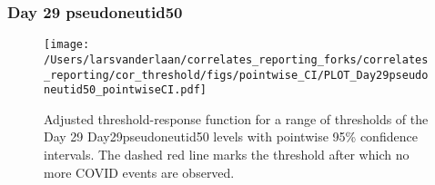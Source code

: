 \documentclass[]{article}
\begin{document}
\clearpage
\clearpage

\clearpage

\hypertarget{day-29-pseudoneutid50}{%
\subsubsection{Day 29 pseudoneutid50}\label{day-29-pseudoneutid50}}

\begin{figure}[H]
\centering
\texttt{[image: /Users/larsvanderlaan/correlates\_reporting\_forks/correlates\_reporting/cor\_threshold/figs/pointwise\_CI/PLOT\_Day29pseudoneutid50\_pointwiseCI.pdf]}
\caption{Adjusted threshold-response function for a range of thresholds of the
  Day 29 Day29pseudoneutid50 levels with pointwise 95\% confidence intervals. The dashed red line marks the threshold after which no more COVID events are observed. }
\end{figure}
\end{document}
